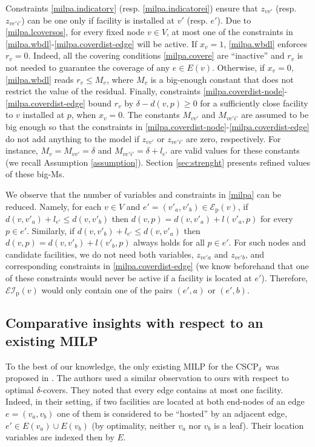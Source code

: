 \documentclass[review]{elsarticle}
\newcommand{\cE}{{\mathcal E}}
\newcommand{\cEI}{{\mathcal {EI}}}
\newcommand{\dlt}{{\delta}}
\newcommand{\problem}{CSCP$_\dlt$}
\theoremstyle{definition}
\begin{document}
Constraints \eqref{milpa.indicatorv} (resp. \eqref{milpa.indicatorei}) ensure that $z_{vv'}$ (resp. $z_{ve'i'}$) can be one only if  facility  is installed at $v'$ (resp. $e'$). Due to \eqref{milpa.lcoversos}, for every fixed node $v\in V$, at most one of the constraints in \eqref{milpa.wbdl}-\eqref{milpa.coverdist-edge} will be active. If $x_{v}=1$, \eqref{milpa.wbdl} enforces $r_{v}=0$. Indeed, all the covering conditions \eqref{milpa.covere} are ``inactive'' and $r_v$ is not needed to guarantee the coverage of any $e\in E(v)$. Otherwise, if $x_{v}=0$,  \eqref{milpa.wbdl} reads $r_{v}\leq M_v$, where $M_v$ is a big-enough constant that does not restrict the value of the residual.
Finally, constraints \eqref{milpa.coverdist-node}-\eqref{milpa.coverdist-edge} bound $r_v$ by $\dlt-d(v,p)\geq 0$ for a sufficiently close facility to $v$ installed at $p$, when $x_v=0$. The constants $M_{vv'}$ and $M_{ve'i'}$ are assumed to be big enough so that the constraints in \eqref{milpa.coverdist-node}-\eqref{milpa.coverdist-edge} do not add anything to the model if $z_{vv'}$ or $z_{ve'i'}$ are zero, respectively. For instance, $M_v=M_{vv'}=\dlt$ and $M_{ve'i'}=\dlt+l_{e'}$ are valid values for these constants (we recall Assumption \ref{assumption}).  Section \ref{sec:strenght} presents refined values of these big-Ms.

We observe that the number of variables and constraints in \eqref{milpa} can be reduced. Namely, for each $v\in V$ and $e'=(v'_a,v'_b)\in\cE_{\mathrm{p}}(v)$, if $d(v,v'_a)+l_{e'}\leq d(v,v'_b)$ then $d(v,p)=d(v, v'_{a})+l(v'_a,p)$ for every $p\in e'$. Similarly, if $d(v,v'_b)+l_{e'}\leq d(v,v'_a)$ then $d(v,p)=d(v, v'_{b})+l(v'_b,p)$ always holds for all $p\in e'$. For such nodes and candidate facilities, we do not need both variables, $z_{ve'a}$ and $z_{ve'b}$, and corresponding constraints in  \eqref{milpa.coverdist-edge} (we know beforehand that one of these constraints would never be active if a facility is located at $e'$). Therefore, $\cEI_{\mathrm{p}}(v)$ would only contain one of the pairs $(e',a)$ or $(e',b)$.



\subsection{Comparative insights with respect to an existing MILP}\label{sec:comp}
To the best of our knowledge, the only existing MILP for the \problem\ was proposed in \cite{Hamacher20}. The authors used a similar observation to ours with respect to optimal $\dlt$-covers. They noted that every edge contains at most one facility. Indeed, in their setting,  if two facilities are located at both end-nodes of an edge $e=(v_a,v_b)$ one of them is considered to be ``hosted'' by an adjacent edge, $e'\in E(v_a)\cup E(v_b)$ (by optimality, neither $v_a$ nor $v_b$ is a leaf). Their location variables are indexed then by $E$.
\end{document}
